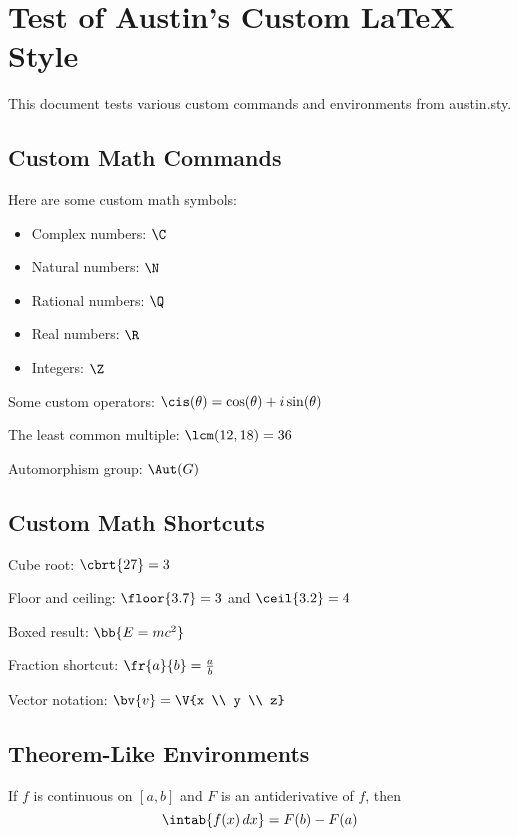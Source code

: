 \documentclass[12pt]{amsart}
\begin{document}
\section{Test of Austin's Custom LaTeX Style}

This document tests various custom commands and environments from austin.sty.

\subsection{Custom Math Commands}

Here are some custom math symbols:
\begin{itemize}
    \item Complex numbers: $\C$
    \item Natural numbers: $\N$
    \item Rational numbers: $\Q$
    \item Real numbers: $\R$
    \item Integers: $\Z$
\end{itemize}

Some custom operators: $\cis(\theta) = \cos(\theta) + i\sin(\theta)$

The least common multiple: $\lcm(12, 18) = 36$

Automorphism group: $\Aut(G)$

\subsection{Custom Math Shortcuts}

Cube root: $\cbrt{27} = 3$

Floor and ceiling: $\floor{3.7} = 3$ and $\ceil{3.2} = 4$

Boxed result: $\bb{E = mc^2}$

Fraction shortcut: $\fr{a}{b} = \frac{a}{b}$

Vector notation: $\bv{v} = \V{x \\ y \\ z}$

\subsection{Theorem-Like Environments}

\begin{theorem}
If $f$ is continuous on $[a,b]$ and $F$ is an antiderivative of $f$, then
$$\intab{f(x) \, dx} = F(b) - F(a)$$
\end{theorem}
\end{document}
